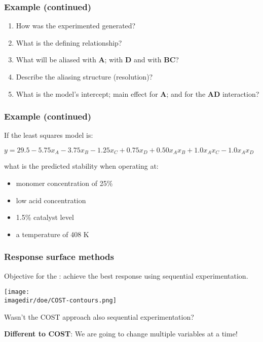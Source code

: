 \begin{frame}\frametitle{Example (continued)}
	\begin{enumerate}
		\item	How was the experimented generated?
		\item	What is the defining relationship?
		\item	What will be aliased with \textbf{A}; with \textbf{D} and with \textbf{BC}?
		\item	Describe the aliasing structure (resolution)?
		\item	What is the model's intercept; main effect for \textbf{A}; and for the \textbf{AD} interaction?
	\end{enumerate}
\end{frame}

\begin{frame}\frametitle{Example (continued)}

	If the least squares model is:

	$ y = 29.5 -5.75x_A -3.75 x_B -1.25 x_C + 0.75 x_D + 0.50 x_A x_B + 1.0 x_A x_C - 1.0 x_A x_D$

	what is the predicted stability when operating at:
	\begin{itemize}
		\item	monomer concentration of 25\%
		\item	low acid concentration
		\item	1.5\% catalyst level
		\item	a temperature of 408 K
	\end{itemize}
\end{frame}

\begin{frame}\frametitle{Response surface methods}

	Objective for the {\color{purple}{response surface method (RSM)}}: achieve the best response using sequential experimentation.
	\begin{center}
		\texttt{[image: \\imagedir/doe/COST-contours.png]}
	\end{center}
	Wasn't the COST approach also sequential experimentation?
	
	\vspace{6pt}
	\textbf{Different to COST}: We are going to change multiple variables at a time!
\end{frame}

